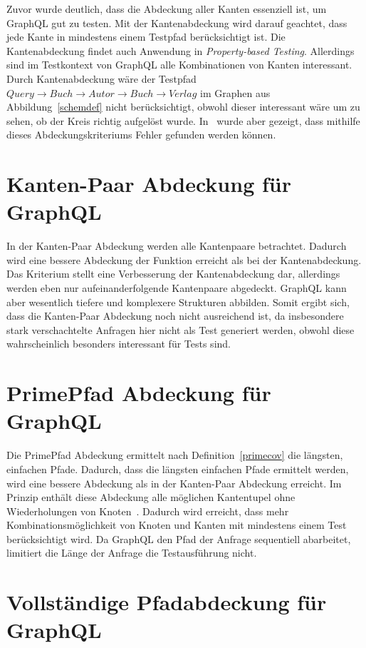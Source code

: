 Zuvor wurde deutlich, dass die Abdeckung aller Kanten essenziell ist, um GraphQL gut zu testen.
Mit der Kantenabdeckung wird darauf geachtet, dass jede Kante in mindestens einem Testpfad berücksichtigt ist.
Die Kantenabdeckung findet auch Anwendung in \textit{Property-based Testing}\cite[vgl. D-RQ1 ]{property-based-testing}.
Allerdings sind im Testkontext von GraphQL alle Kombinationen von Kanten interessant.
Durch Kantenabdeckung wäre der Testpfad $Query \rightarrow Buch \rightarrow Autor \rightarrow Buch \rightarrow Verlag$
im Graphen aus Abbildung~\ref{schemdef} nicht berücksichtigt, obwohl dieser interessant wäre um zu sehen, ob der Kreis richtig aufgelöst wurde.
In~\cite{property-based-testing} wurde aber gezeigt, dass mithilfe dieses Abdeckungskriteriums Fehler gefunden werden können.

\section{Kanten-Paar Abdeckung für GraphQL}

In der Kanten-Paar Abdeckung werden alle Kantenpaare betrachtet.
Dadurch wird eine bessere Abdeckung der Funktion erreicht als bei der Kantenabdeckung.
Das Kriterium stellt eine Verbesserung der Kantenabdeckung dar, allerdings werden eben nur aufeinanderfolgende Kantenpaare abgedeckt.
GraphQL kann aber wesentlich tiefere und komplexere Strukturen abbilden.
Somit ergibt sich, dass die Kanten-Paar Abdeckung noch nicht ausreichend ist, da insbesondere stark verschachtelte Anfragen hier nicht als Test generiert werden,
obwohl diese wahrscheinlich besonders interessant für Tests sind.

\section{PrimePfad Abdeckung für GraphQL}

Die PrimePfad Abdeckung ermittelt nach Definition~\ref{primecov} die längsten, einfachen Pfade.
Dadurch, dass die längsten einfachen Pfade ermittelt werden, wird eine bessere Abdeckung als in der Kanten-Paar Abdeckung erreicht.
Im Prinzip enthält diese Abdeckung alle möglichen Kantentupel ohne Wiederholungen von Knoten~\cite[vgl. S. 42]{software-testing}.
Dadurch wird erreicht, dass mehr Kombinationsmöglichkeit von Knoten und Kanten mit mindestens einem Test berücksichtigt wird.
Da GraphQL den Pfad der Anfrage sequentiell abarbeitet, limitiert die Länge der Anfrage die Testausführung nicht.

\section{Vollständige Pfadabdeckung für GraphQL}

